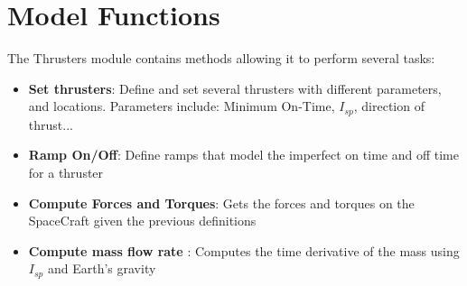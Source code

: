 \section{Model Functions}

The Thrusters module contains methods allowing it to perform several tasks:

\begin{itemize}
	\item \textbf{Set thrusters}: Define and set several thrusters with different parameters, and locations. Parameters include: Minimum On-Time, $I_{sp}$, direction of thrust...
	\item \textbf{Ramp On/Off}: Define ramps that model the imperfect on time and off time for a thruster
	\item \textbf{Compute Forces and Torques}: Gets the forces and torques on the SpaceCraft given the previous definitions
	\item \textbf{Compute mass flow rate }: Computes the time derivative of the mass using $I_{sp}$ and Earth's gravity
\end{itemize}